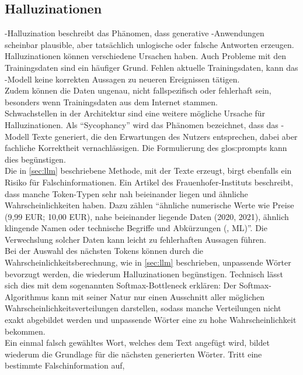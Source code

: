 \documentclass[../main.tex]{subfiles}
\begin{document}
\subsection{Halluzinationen}
 -Halluzination beschreibt 
das Phänomen, dass generative -Anwendungen scheinbar plausible, aber tatsächlich unlogische oder falsche Antworten erzeugen\cite{hallucinationForewarning}.\\
Halluzinationen können verschiedene Ursachen haben. Auch Probleme mit den Trainingsdaten sind ein häufiger Grund. Fehlen aktuelle Trainingsdaten, kann das -Modell keine korrekten Aussagen zu neueren Ereignissen tätigen.\\ 
Zudem können die Daten ungenau, nicht fallspezifisch oder fehlerhaft sein, besonders wenn Trainingsdaten aus dem Internet stammen.\\ 
Schwachstellen in der Architektur sind eine weitere mögliche Ursache für Halluzinationen. Als "`Sycophancy"' wird das Phänomen bezeichnet, dass das -Modell Texte 
generiert, die den Erwartungen des Nutzers entsprechen, dabei aber fachliche Korrektheit vernachlässigen. Die Formulierung des \gls{glos:prompt}s kann dies begünstigen.\cite{allgemHalluzinationen} \\
Die in \autoref{sec:llm} beschriebene Methode, mit der  Texte erzeugt, birgt ebenfalls ein Risiko für Falschinformationen. Ein Artikel des Frauenhofer-Instituts beschreibt, dass manche Token-Typen sehr nah beieinander liegen 
und ähnliche Wahrscheinlichkeiten haben. Dazu zählen "`ähnliche numerische Werte wie Preise (9,99 EUR; 10,00 EUR), nahe beieinander liegende Daten (2020, 2021), ähnlich klingende Namen oder 
technische Begriffe und Abkürzungen (, ML)"'\cite{halluzinationenFraunhofer}. Die Verwechslung solcher Daten kann leicht zu fehlerhaften Aussagen führen.\\
Bei der Auswahl des nächsten Tokens können durch die Wahrscheinlichkeitsberechnung, wie in \autoref{sec:llm}  beschrieben, unpassende Wörter bevorzugt werden, die wiederum Halluzinationen 
begünstigen. Technisch lässt sich dies mit dem sogenannten Softmax-Bottleneck erklären: Der Softmax-Algorithmus kann mit seiner Natur nur einen Ausschnitt aller möglichen 
Wahrscheinlichkeitsverteilungen darstellen, sodass manche Verteilungen nicht exakt abgebildet werden und unpassende Wörter eine zu hohe Wahrscheinlichkeit bekommen.\cite{softmax} \\
Ein einmal falsch gewähltes Wort, welches dem Text angefügt wird, bildet wiederum die Grundlage für die nächsten generierten Wörter. Tritt eine bestimmte Falschinformation auf, 
\end{document}

